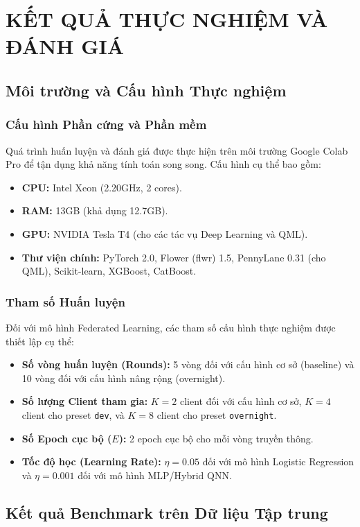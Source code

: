 \section{KẾT QUẢ THỰC NGHIỆM VÀ ĐÁNH GIÁ}

\subsection{Môi trường và Cấu hình Thực nghiệm}
\subsubsection{Cấu hình Phần cứng và Phần mềm}
Quá trình huấn luyện và đánh giá được thực hiện trên môi trường Google Colab Pro để tận dụng khả năng tính toán song song. Cấu hình cụ thể bao gồm:
\begin{itemize}
    \item \textbf{CPU:} Intel Xeon (2.20GHz, 2 cores).
    \item \textbf{RAM:} 13GB (khả dụng 12.7GB).
    \item \textbf{GPU:} NVIDIA Tesla T4 (cho các tác vụ Deep Learning và QML).
    \item \textbf{Thư viện chính:} PyTorch 2.0, Flower (flwr) 1.5, PennyLane 0.31 (cho QML), Scikit-learn, XGBoost, CatBoost.
\end{itemize}

\subsubsection{Tham số Huấn luyện}
Đối với mô hình Federated Learning, các tham số cấu hình thực nghiệm được thiết lập cụ thể:
\begin{itemize}
    \item \textbf{Số vòng huấn luyện (Rounds):} 5 vòng đối với cấu hình cơ sở (baseline) và 10 vòng đối với cấu hình nâng rộng (overnight).
    \item \textbf{Số lượng Client tham gia:} $K=2$ client đối với cấu hình cơ sở, $K=4$ client cho preset \texttt{dev}, và $K=8$ client cho preset \texttt{overnight}.
    \item \textbf{Số Epoch cục bộ ($E$):} 2 epoch cục bộ cho mỗi vòng truyền thông.
    \item \textbf{Tốc độ học (Learning Rate):} $\eta = 0.05$ đối với mô hình Logistic Regression và $\eta = 0.001$ đối với mô hình MLP/Hybrid QNN.
\end{itemize}

\subsection{Kết quả Benchmark trên Dữ liệu Tập trung}

